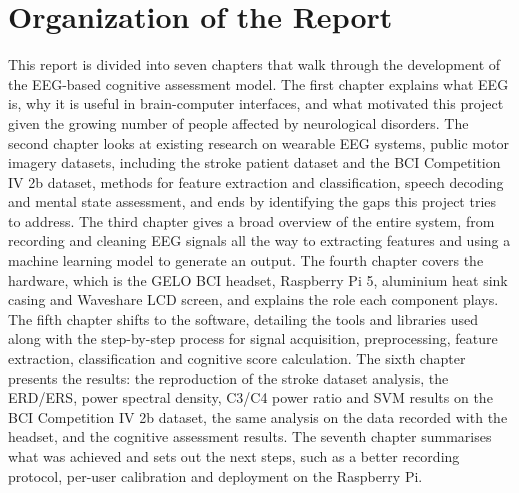 \section{Organization of the Report}
This report is divided into seven chapters that walk through the development of the EEG-based cognitive assessment model. The first chapter explains what EEG is, why it is useful in brain-computer interfaces, and what motivated this project given the growing number of people affected by neurological disorders. The second chapter looks at existing research on wearable EEG systems, public motor imagery datasets, including the stroke patient dataset and the BCI Competition IV 2b dataset, methods for feature extraction and classification, speech decoding and mental state assessment, and ends by identifying the gaps this project tries to address. The third chapter gives a broad overview of the entire system, from recording and cleaning EEG signals all the way to extracting features and using a machine learning model to generate an output. The fourth chapter covers the hardware, which is the GELO BCI headset, Raspberry Pi 5, aluminium heat sink casing and Waveshare LCD screen, and explains the role each component plays. The fifth chapter shifts to the software, detailing the tools and libraries used along with the step-by-step process for signal acquisition, preprocessing, feature extraction, classification and cognitive score calculation. The sixth chapter presents the results: the reproduction of the stroke dataset analysis, the ERD/ERS, power spectral density, C3/C4 power ratio and SVM results on the BCI Competition IV 2b dataset, the same analysis on the data recorded with the headset, and the cognitive assessment results. The seventh chapter summarises what was achieved and sets out the next steps, such as a better recording protocol, per-user calibration and deployment on the Raspberry Pi.
